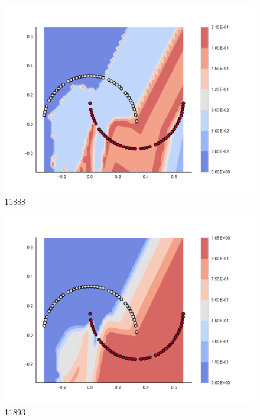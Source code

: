 \begin{subfigure}[b]{0.09\textwidth}
    \includegraphics[clip, trim=2.35cm 1.75cm 4.5cm 0cm,width=\textwidth]{img/convergence/11888.pdf}
    \caption{11888}
    \label{fig:convergence_11888}
\end{subfigure}
%
\begin{subfigure}[b]{0.09\textwidth}
    \includegraphics[clip, trim=2.35cm 1.75cm 4.5cm 0cm,width=\textwidth]{img/convergence/11893.pdf}
    \caption{11893}
    \label{fig:convergence_11893}
\end{subfigure}
%
